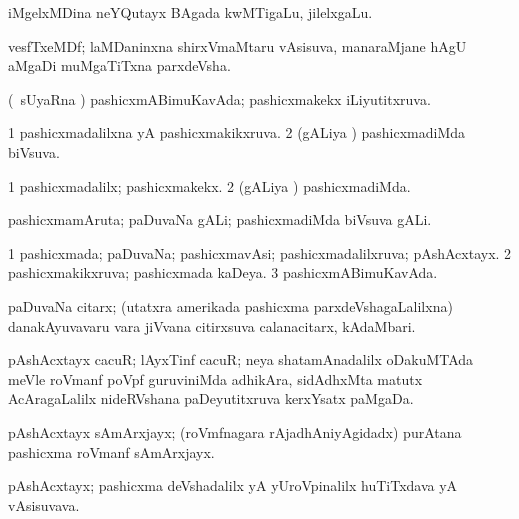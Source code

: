 \bentry
{} 
\gl{\nA}
\expl{}
\bmng
iMgelxMDina neYQutayx BAgada kwMTigaLu, jilelxgaLu. 
\emng
\eentry

\bentry
{} 
\gl{\nA}
\expl{}
\bmng
vesfTxeMDf; laMDaninxna shirxVmaMtaru vAsisuva, manaraMjane hAgU aMgaDi muMgaTiTxna parxdeVsha. 
\emng
\eentry

\bentry
{} 
\gl{\gu}
\expl{}
\bmng
(\kanmu\ sUyaRna \vi) pashicxmABimuKavAda; pashicxmakekx iLiyutitxruva. 
\emng
\eentry

\bentry
{} 
\gl{\gu}
\expl{}
\bmng
\bnum
\num{1} pashicxmadalilxna yA pashicxmakikxruva. 
\num{2} (gALiya \vi) pashicxmadiMda biVsuva. 
\enum
\emng
\eentry

\bentry
{} 
\gl{\kirxvi}
\expl{}
\bmng
\bnum
\num{1} pashicxmadalilx; pashicxmakekx. 
\num{2} (gALiya \vi) pashicxmadiMda. 
\enum
\emng
\eentry

\bentry
{} 
\gl{\nA}
\bmng
pashicxmamAruta; paDuvaNa gALi; pashicxmadiMda biVsuva gALi. 
\emng
\eentry

\bentry
{} 
\gl{\gu}
\expl{}
\bmng
\bnum
\num{1} pashicxmada; paDuvaNa; pashicxmavAsi; pashicxmadalilxruva; pAshAcxtayx. 
\num{2} pashicxmakikxruva; pashicxmada kaDeya. 
\num{3} pashicxmABimuKavAda. 
\enum
\emng
\eentry

\bentry
{} 
\gl{\nA}
\expl{}
\bmng
paDuvaNa citarx; (utatxra amerikada pashicxma parxdeVshagaLalilxna) danakAyuvavaru \mo vara jiVvana citirxsuva calanacitarx, kAdaMbari. 
\emng
\eentry

\bentry
{} 
\gl{\nA}
\expl{}
\bmng
pAshAcxtayx cacuR; lAyxTinf cacuR; neya shatamAnadalilx oDakuMTAda meVle roVmanf poVpf guruviniMda adhikAra, sidAdhxMta matutx AcAragaLalilx nideRVshana paDeyutitxruva kerxYsatx paMgaDa. 
\emng
\eentry

\bentry
{} 
\gl{\nA}
\expl{}
\bmng
pAshAcxtayx sAmArxjayx; (roVmfnagara rAjadhAniyAgidadx) purAtana pashicxma roVmanf sAmArxjayx. 
\emng
\eentry

\bentry
{} 
\gl{\nA}
\expl{}
\bmng
pAshAcxtayx; pashicxma deVshadalilx yA yUroVpinalilx huTiTxdava yA vAsisuvava. 
\emng
\eentry

